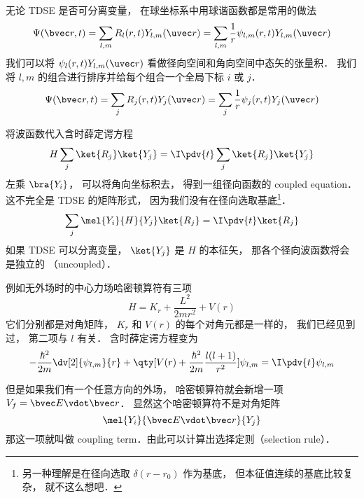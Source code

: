 

无论 TDSE 是否可分离变量， 在球坐标系中用球谐函数都是常用的做法
\begin{equation}\label{RYTDSE_eq1}
\Psi(\bvec r, t) = \sum_{l,m} R_l (r, t) Y_{l,m} (\uvec r) = \sum_{l,m} \frac{1}{r} \psi_{l,m} (r, t) Y_{l,m} (\uvec r)
\end{equation}
我们可以将 $\psi_l (r, t) Y_{l,m} (\uvec r)$ 看做径向空间和角向空间中态矢的张量积． 我们将 $l, m$ 的组合进行排序并给每个组合一个全局下标 $i$ 或 $j$．
\begin{equation}
\Psi(\bvec r, t) = \sum_j R_j (r, t) Y_j (\uvec r) = \sum_j \frac{1}{r} \psi_j (r, t) Y_j (\uvec r)
\end{equation}

将波函数代入含时薛定谔方程
\begin{equation}
H \sum_j\ket{R_j}\ket{Y_j} = \I \pdv{t}  \sum_j\ket{R_j}\ket{Y_j}
\end{equation}
左乘 $\bra{Y_i}$， 可以将角向坐标积去， 得到一组径向函数的 coupled equation． 这不完全是 TDSE 的矩阵形式， 因为我们没有在径向选取基底\footnote{另一种理解是在径向选取 $\delta(r - r_0)$ 作为基底， 但本征值连续的基底比较复杂， 就不这么想吧．}．
\begin{equation}
\sum_j \mel{Y_i}{H}{Y_j} \ket{R_j} = \I \pdv{t} \ket{R_j}
\end{equation}
如果 TDSE 可以分离变量， $\ket{Y_j}$ 是 $H$ 的本征矢， 那各个径向波函数将会是独立的 （uncoupled）．

例如无外场时的中心力场哈密顿算符有三项
\begin{equation}
H = K_r + \frac{L^2}{2mr^2} + V(r)
\end{equation}
它们分别都是对角矩阵， $K_r$ 和 $V(r)$ 的每个对角元都是一样的， 我们已经见到过， 第二项与 $l$ 有关． 含时薛定谔方程变为
\begin{equation}
-\frac{\hbar^2}{2m} \dv[2]{\psi_{l,m}}{r} + \qty[V(r) + \frac{\hbar^2}{2m}\frac{l(l + 1)}{r^2}]\psi_{l,m} = \I \pdv{t} \psi_{l,m}
\end{equation}

但是如果我们有一个任意方向的外场， 哈密顿算符就会新增一项 $V_f = \bvec E \vdot \bvec r$． 显然这个哈密顿算符不是对角矩阵
\begin{equation}
\mel{Y_i}{\bvec E \vdot \bvec r}{Y_j}
\end{equation}
那这一项就叫做 coupling term．由此可以计算出选择定则（selection rule）．

